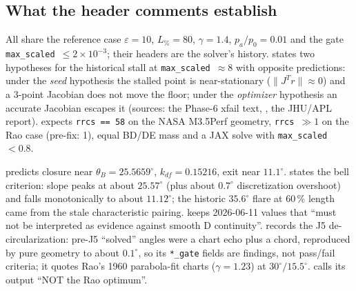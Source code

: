 \subsection{What the header comments establish}
All share the reference case $\varepsilon=10$, $L_\%=80$, $\gamma=1.4$, $p_a/p_0=0.01$ and the gate \texttt{max\_scaled}~$\le2\times10^{-3}$; their headers are the solver's history.  states two hypotheses for the historical stall at \texttt{max\_scaled}~$\approx8$ with opposite predictions: under the \emph{seed} hypothesis the stalled point is near-stationary ($\lVert J^Tr\rVert\approx0$) and a 3-point Jacobian does not move the floor; under the \emph{optimizer} hypothesis an accurate Jacobian escapes it (sources: the Phase-6 xfail text, , the JHU/APL report).  expects \texttt{rrcs == 58} on the NASA M3.5Perf geometry, \texttt{rrcs}~$\gg1$ on the Rao case (pre-fix: 1), equal BD/DE mass and a JAX solve with \texttt{max\_scaled}~$<0.8$.

 predicts closure near $\theta_B=25.5659^\circ$, $k_{df}=0.15216$, exit near $11.1^\circ$.  states the bell criterion: slope peaks at about $25.57^\circ$ (plus about $0.7^\circ$ discretization overshoot) and falls monotonically to about $11.12^\circ$; the historic $35.6^\circ$ flare at 60\,\% length came from the stale characteristic pairing.  keeps 2026-06-11 values that ``must not be interpreted as evidence against smooth D continuity''.  records the J5 de-circularization: pre-J5 ``solved'' angles were a chart echo plus a chord, reproduced by pure geometry to about $0.1^\circ$, so its \texttt{*\_gate} fields are findings, not pass/fail criteria; it quotes Rao's 1960 parabola-fit charts ($\gamma=1.23$) at $30^\circ/15.5^\circ$.  calls its output ``NOT the Rao optimum''.

